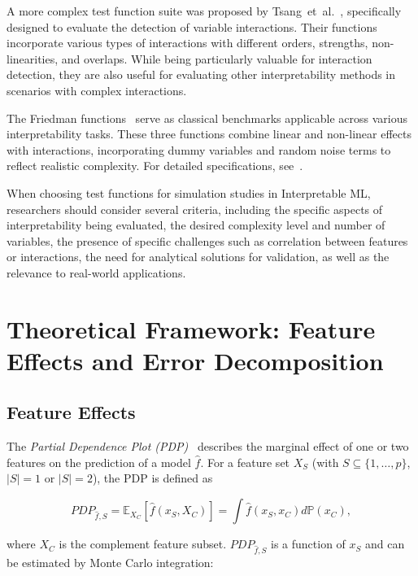 \documentclass[runningheads]{llncs}
\begin{document}
A more complex test function suite was proposed by
Tsang~et~al.~\cite{tsang_detecting_2017}, specifically designed to evaluate the
detection of variable interactions. Their functions incorporate various types
of interactions with different orders, strengths, non-linearities, and
overlaps. While being particularly valuable for interaction 
detection, they are also useful for evaluating other interpretability methods
in scenarios with complex interactions.

The Friedman functions~\cite{breiman_bagging_1996,friedman_multivariate_1991}
serve as classical benchmarks applicable across various interpretability tasks.
These three functions combine linear and non-linear effects with interactions,
incorporating dummy variables and random noise terms to reflect realistic
complexity. For detailed specifications, see~\cite{breiman_bagging_1996}.

When choosing test functions for simulation studies in Interpretable ML,
researchers should consider several criteria, including the specific aspects of
interpretability being evaluated, the desired complexity level and number of
variables, the presence of specific challenges such as correlation between
features or interactions, the need for analytical solutions for validation, as
well as the relevance to real-world applications.

\section{Theoretical Framework: Feature Effects and Error Decomposition}\label{sec:background}

\subsection{Feature Effects}

The \textit{Partial Dependence Plot (PDP)}~\cite{friedman_greedy_2001} describes the marginal effect of one or
two features on the prediction of a model $\hat f$. For a feature set $X_S$
(with $S \subseteq \{1,\ldots,p\}$, $|S| = 1$ or $|S| = 2$), the PDP is defined
as

\begin{equation}
    PDP_{\hat f, S} = \mathbb{E}_{X_C}[\hat{f}(x_S, X_C)] = \int \hat f(x_S, x_C)d\mathbb{P}(x_C),
\end{equation}

\noindent where $X_C$ is the complement feature subset. $PDP_{\hat f, S}$ is a
function of $x_S$ and can be estimated by Monte Carlo integration:
\end{document}
